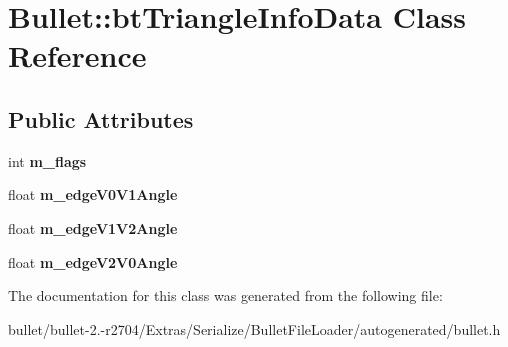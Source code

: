\hypertarget{class_bullet_1_1bt_triangle_info_data}{\section{Bullet\+:\+:bt\+Triangle\+Info\+Data Class Reference}
\label{class_bullet_1_1bt_triangle_info_data}
}
\subsection*{Public Attributes}
\begin{DoxyCompactItemize}
\item 
\hypertarget{class_bullet_1_1bt_triangle_info_data_a42ca47866f7617abc1a1bfb4447f4e39}{int {\bfseries m\+\_\+flags}}\label{class_bullet_1_1bt_triangle_info_data_a42ca47866f7617abc1a1bfb4447f4e39}

\item 
\hypertarget{class_bullet_1_1bt_triangle_info_data_a99f4da7b55227e317858232952b0a26d}{float {\bfseries m\+\_\+edge\+V0\+V1\+Angle}}\label{class_bullet_1_1bt_triangle_info_data_a99f4da7b55227e317858232952b0a26d}

\item 
\hypertarget{class_bullet_1_1bt_triangle_info_data_a571d5d356d133bec4bbf46460c549cfa}{float {\bfseries m\+\_\+edge\+V1\+V2\+Angle}}\label{class_bullet_1_1bt_triangle_info_data_a571d5d356d133bec4bbf46460c549cfa}

\item 
\hypertarget{class_bullet_1_1bt_triangle_info_data_a4e681b7aa5af76105500ed0d0b3e1c55}{float {\bfseries m\+\_\+edge\+V2\+V0\+Angle}}\label{class_bullet_1_1bt_triangle_info_data_a4e681b7aa5af76105500ed0d0b3e1c55}

\end{DoxyCompactItemize}


The documentation for this class was generated from the following file\+:\begin{DoxyCompactItemize}
\item 
bullet/bullet-\/2.-\/r2704/\+Extras/\+Serialize/\+Bullet\+File\+Loader/autogenerated/bullet.\+h\end{DoxyCompactItemize}
